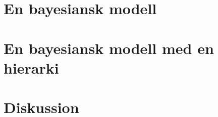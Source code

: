 \documentclass{assignment}
\begin{document}
\section{En bayesiansk modell}
\section{En bayesiansk modell med en hierarki}
\section{Diskussion}

%  
\end{document}
